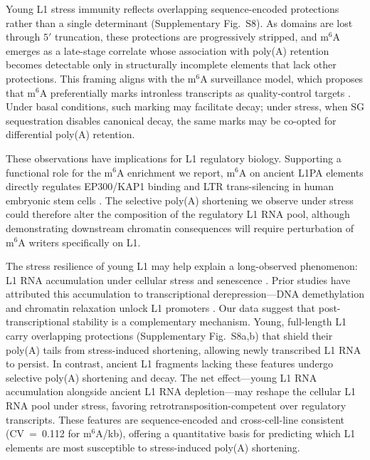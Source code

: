 \documentclass[11pt]{article}
\newcommand{\msix}{m$^6$A}
\begin{document}
Young L1 stress immunity reflects overlapping sequence-encoded
protections rather than a single determinant
(Supplementary Fig.~S8). As domains are lost through $5'$ truncation,
these protections are progressively stripped, and \msix{} emerges as a
late-stage correlate whose association with poly(A) retention becomes
detectable only in structurally incomplete elements that lack other
protections. This framing aligns with the \msix{} surveillance model,
which proposes that \msix{} preferentially marks intronless transcripts
as quality-control targets \citep{Ke2026}. Under basal conditions, such
marking may facilitate decay; under stress, when SG sequestration
disables canonical decay, the same marks may be co-opted for
differential poly(A) retention.

These observations have implications for L1 regulatory biology.
Supporting a functional role for the \msix{} enrichment we report,
\msix{} on ancient L1PA elements directly regulates
EP300/KAP1 binding and LTR trans-silencing in human embryonic stem cells
\citep{Zhu2025L1PA}. The selective poly(A) shortening we observe under
stress could therefore alter the composition of the regulatory L1 RNA
pool, although demonstrating downstream chromatin consequences will
require perturbation of \msix{} writers specifically on L1.

The stress resilience of young L1 may help explain a long-observed
phenomenon: L1 RNA accumulation under cellular stress and senescence
\citep{DeCecco2019,Gorbunova2021}. Prior studies have attributed this
accumulation to transcriptional derepression---DNA demethylation and
chromatin relaxation unlock L1 promoters
\citep{Gorbunova2021}. Our
data suggest that post-transcriptional stability is a complementary
mechanism. Young, full-length L1 carry overlapping protections
(Supplementary Fig.~S8a,b) that shield their poly(A) tails from
stress-induced shortening, allowing newly transcribed L1 RNA to
persist. In contrast, ancient L1 fragments lacking these features
undergo selective poly(A) shortening and decay. The net effect---young
L1 RNA accumulation alongside ancient L1 RNA depletion---may reshape
the cellular L1 RNA pool under stress, favoring retrotransposition-competent
over regulatory transcripts. These features are sequence-encoded and
cross-cell-line consistent (CV~=~0.112 for \msix{}/kb), offering a
quantitative basis for predicting which L1 elements are most
susceptible to stress-induced poly(A) shortening.
\end{document}
